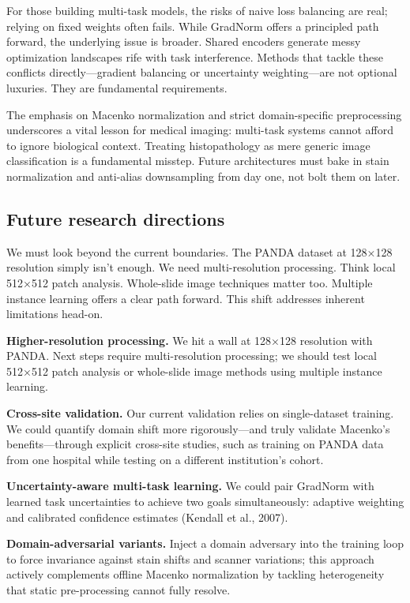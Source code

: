 \documentclass[conference,a4paper]{IEEEtran}
\begin{document}
For those building multi-task models, the risks of naive loss balancing are real; relying on fixed weights often fails. While GradNorm offers a principled path forward, the underlying issue is broader. Shared encoders generate messy optimization landscapes rife with task interference. Methods that tackle these conflicts directly—gradient balancing or uncertainty weighting—are not optional luxuries. They are fundamental requirements.

The emphasis on Macenko normalization and strict domain-specific preprocessing underscores a vital lesson for medical imaging: multi-task systems cannot afford to ignore biological context. Treating histopathology as mere generic image classification is a fundamental misstep. Future architectures must bake in stain normalization and anti-alias downsampling from day one, not bolt them on later.

\subsection{Future research directions}
We must look beyond the current boundaries. The PANDA dataset at 128×128 resolution simply isn't enough. We need multi-resolution processing. Think local 512×512 patch analysis. Whole-slide image techniques matter too. Multiple instance learning offers a clear path forward. This shift addresses inherent limitations head-on.

\textbf{Higher-resolution processing.} We hit a wall at 128×128 resolution with PANDA. Next steps require multi-resolution processing; we should test local 512×512 patch analysis or whole-slide image methods using multiple instance learning.

\textbf{Cross-site validation.} Our current validation relies on single-dataset training. We could quantify domain shift more rigorously—and truly validate Macenko’s benefits—through explicit cross-site studies, such as training on PANDA data from one hospital while testing on a different institution's cohort.

\textbf{Uncertainty-aware multi-task learning.} We could pair GradNorm with learned task uncertainties to achieve two goals simultaneously: adaptive weighting and calibrated confidence estimates (Kendall et al., 2007).

\textbf{Domain-adversarial variants.} Inject a domain adversary into the training loop to force invariance against stain shifts and scanner variations; this approach actively complements offline Macenko normalization by tackling heterogeneity that static pre-processing cannot fully resolve.
\end{document}
